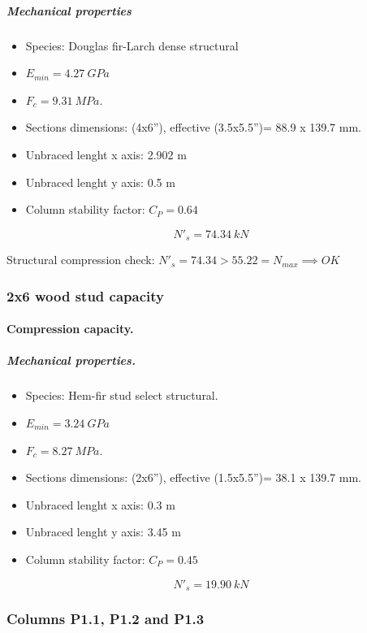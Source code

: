 \subparagraph{Mechanical properties}

\begin{itemize}
\item Species: Douglas fir-Larch dense structural
\item $E_{min}= 4.27\ GPa$
\item $F_c= 9.31\ MPa$.
\item Sections dimensions: (4x6''), effective (3.5x5.5'')= 88.9 x 139.7  mm.
\item Unbraced lenght x axis: 2.902 m
\item Unbraced lenght y axis: 0.5 m
\item Column stability factor: $C_P= 0.64$
\end{itemize}

\begin{equation}
  N'_s= 74.34\ kN
\end{equation}

\noindent Structural compression check: $N'_s = 74.34 > 55.22 = N_{max} \implies OK$

\subsubsection{2x6 wood stud capacity}

\paragraph{Compression capacity.}

\subparagraph{Mechanical properties.}

\begin{itemize}
\item Species: Hem-fir stud select structural.
\item $E_{min}= 3.24\ GPa$
\item $F_c= 8.27\ MPa$.
\item Sections dimensions: (2x6''), effective (1.5x5.5'')= 38.1 x 139.7  mm.
\item Unbraced lenght x axis: 0.3 m
\item Unbraced lenght y axis: 3.45 m
\item Column stability factor: $C_P= 0.45$
\end{itemize}

\begin{equation}
  N'_s= 19.90\ kN
\end{equation}


\subsubsection{Columns P1.1, P1.2 and P1.3}

